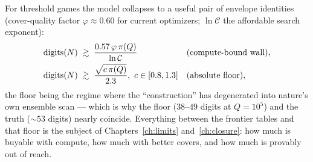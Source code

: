 For threshold games the model collapses to a useful pair of envelope
identities (cover-quality factor $\varphi\approx0.60$ for current
optimizers; $\ln\mathcal C$ the affordable search exponent):
\begin{align*}
\mathrm{digits}(\N)\;&\gtrsim\;\frac{0.57\,\varphi\,\pi(Q)}{\ln\mathcal C}
&&\text{(compute-bound wall)},\\
\mathrm{digits}(\N)\;&\gtrsim\;\frac{\sqrt{c\,\pi(Q)}}{2.3},\ c\in[0.8,1.3]
&&\text{(absolute floor)},
\end{align*}
the floor being the regime where the ``construction'' has degenerated
into nature's own ensemble scan --- which is why the floor
($38$--$49$ digits at $Q=10^5$) and the truth ($\sim53$ digits) nearly
coincide. Everything between the frontier tables and that floor is the
subject of Chapters~\ref{ch:limits} and~\ref{ch:closure}: how much is
buyable with compute, how much with better covers, and how much is
provably out of reach.
